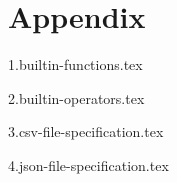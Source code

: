 
\chapter{Appendix}
{
	\lipsum[1]
	
	{1.builtin-functions.tex}
	
	{2.builtin-operators.tex}
	
	{3.csv-file-specification.tex}
	
	{4.json-file-specification.tex}
}

